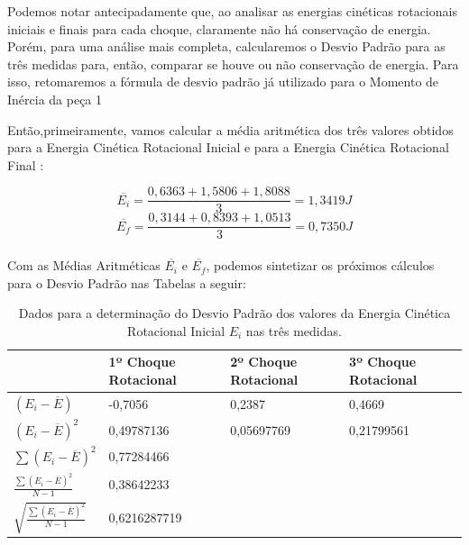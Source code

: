 Podemos notar antecipadamente que, ao analisar as energias cinéticas rotacionais iniciais e finais para cada choque, claramente não há conservação de energia. Porém, para uma análise mais completa, calcularemos o Desvio Padrão para as três medidas para, então, comparar se houve ou não conservação de energia. Para isso, retomaremos a fórmula de desvio padrão já utilizado para o Momento de Inércia da peça 1

Então,primeiramente, vamos calcular a média aritmética dos três valores obtidos para a Energia Cinética Rotacional Inicial e para a Energia Cinética Rotacional Final :

\[\overline{E_i} = \frac{0,6363 + 1,5806 + 1,8088}{3} = 1,3419 J\]
\[\overline{E_f} = \frac{0,3144 +  0,8393 + 1,0513}{3} = 0,7350 J\]\\

Com as Médias Aritméticas $\overline{E_i}$ e $\overline{E_f}$, podemos sintetizar os próximos cálculos para o Desvio Padrão nas Tabelas a seguir:

\begin{table}[H]
    \centering
    \begin{tabular}{ |M{3cm}||M{2.8cm}||M{2.8cm}||M{2.8cm}|}
        \hline
        \textbf{ } & \textbf{1º Choque Rotacional} & \textbf{2º Choque Rotacional} & \textbf{3º Choque Rotacional}\\
        \hline
        $(E_i - \overline{E})$                                        & -0,7056    & 0,2387  & 0,4669\\
        $(E_i - \overline{E})^2$                                      & 0,49787136    & 0,05697769  & 0,21799561\\
        $\sum(E_i - \overline{E})^2$                                  & 0,77284466  &    & \\
        $\frac {\sum(E_i - \overline{E})^2}{N-1}$                     & 0,38642233   &    &\\
        $\sqrt{\frac {\sum(E_i - \overline{E})^2}{N-1}}$              & 0,6216287719   &    &\\
        \hline
    \end{tabular}
    \caption{Dados para a determinação do Desvio Padrão dos valores da Energia Cinética Rotacional Inicial $E_i$ nas três medidas.}
\end{table}

